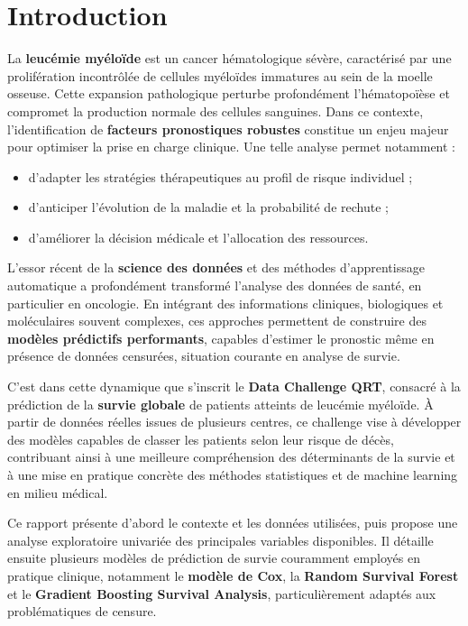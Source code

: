 \documentclass[12pt,a4paper]{article}
\begin{document}
\section{Introduction}
La \textbf{leucémie myéloïde} est un cancer hématologique sévère, caractérisé par une prolifération incontrôlée de cellules myéloïdes immatures au sein de la moelle osseuse. Cette expansion pathologique perturbe profondément l’hématopoïèse et compromet la production normale des cellules sanguines. Dans ce contexte, l’identification de \textbf{facteurs pronostiques robustes} constitue un enjeu majeur pour optimiser la prise en charge clinique. Une telle analyse permet notamment :
\begin{itemize}
    \item d’adapter les stratégies thérapeutiques au profil de risque individuel ;
    \item d’anticiper l’évolution de la maladie et la probabilité de rechute ;
    \item d’améliorer la décision médicale et l’allocation des ressources.
\end{itemize}

L’essor récent de la \textbf{science des données} et des méthodes d’apprentissage automatique a profondément transformé l’analyse des données de santé, en particulier en oncologie. En intégrant des informations cliniques, biologiques et moléculaires souvent complexes, ces approches permettent de construire des \textbf{modèles prédictifs performants}, capables d’estimer le pronostic même en présence de données censurées, situation courante en analyse de survie.

C’est dans cette dynamique que s’inscrit le \textbf{Data Challenge QRT}, consacré à la prédiction de la \textbf{survie globale} de patients atteints de leucémie myéloïde. À partir de données réelles issues de plusieurs centres, ce challenge vise à développer des modèles capables de classer les patients selon leur risque de décès, contribuant ainsi à une meilleure compréhension des déterminants de la survie et à une mise en pratique concrète des méthodes statistiques et de machine learning en milieu médical.

Ce rapport présente d’abord le contexte et les données utilisées, puis propose une analyse exploratoire univariée des principales variables disponibles. Il détaille ensuite plusieurs modèles de prédiction de survie couramment employés en pratique clinique, notamment le \textbf{modèle de Cox}, la \textbf{Random Survival Forest} et le \textbf{Gradient Boosting Survival Analysis}, particulièrement adaptés aux problématiques de censure.
\end{document}
